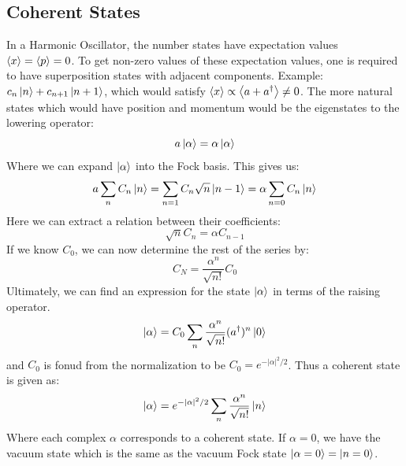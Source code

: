 \subsection{Coherent States}
In a Harmonic Oscillator, the number states have expectation values $\expval{x} = \expval{p} = 0$. To get non-zero values of these expectation values, one is required to have superposition states with adjacent components. Example: $c_n\ket{n} + c_{n+1} \ket{n+1}$, which would satisfy $\expval{x} \propto \expval{a + a^\dagger} \neq 0$. The more natural states which would have position and momentum would be the eigenstates to the lowering operator:
\begin{equation}
    a \ket{\alpha} = \alpha \ket{\alpha}
\end{equation}
Where we can expand $\ket{\alpha}$ into the Fock basis. This gives us:
\begin{align}
    a \sum_n C_n \ket{n} =     \sum_{n = 1} C_n \sqrt{n} \ket{n - 1} = \alpha \sum_{n = 0} C_n \ket{n}
\end{align}
Here we can extract a relation between their coefficients:
\begin{equation}
    \sqrt{n} C_n = \alpha C_{n - 1}
\end{equation}
If we know $C_0$, we can now determine the rest of the series by:
\begin{equation}
    C_N = \frac{\alpha^n}{\sqrt{n!}} C_0 
\end{equation}
Ultimately, we can find an expression for the state $\ket{\alpha}$ in terms of the raising operator.
\begin{equation}
    \ket{\alpha} = C_0 \sum_n \frac{\alpha^n} {\sqrt{n!}} (a^\dagger)^n \ket{0}
\end{equation}
and $C_0$ is fonud from the normalization to be $C_0 = e^{- |\alpha|^2 / 2}$. Thus a coherent state is given as:
\begin{equation}
    \ket{\alpha} = e^{-|\alpha|^2 / 2} \sum_n \frac{\alpha^n}{\sqrt{n!}} \ket{n}
\end{equation}
Where each complex $\alpha$ corresponds to a coherent state. If $\alpha = 0$, we have the vacuum state which is the same as the vacuum Fock state $\ket{\alpha = 0} = \ket{n = 0}$. 




